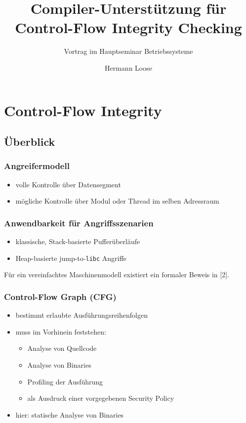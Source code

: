 \documentclass[serif,slidestop,compress,red]{beamer}
\title{Compiler-Unterstützung für \\ Control-Flow Integrity Checking}
\subtitle{Vortrag im Hauptseminar Betriebssysteme}
\author{Hermann Loose}
\begin{document}
\frame[plain]{\titlepage}

\section{Control-Flow Integrity}

\subsection{Überblick}

\begin{frame}
  \frametitle{Angreifermodell}
  \begin{itemize}
    \item volle Kontrolle über Datensegment
    \item mögliche Kontrolle über Modul oder Thread im selben Adressraum
  \end{itemize}
\end{frame}

\begin{frame}
  \frametitle{Anwendbarkeit für Angriffsszenarien}
  \begin{itemize}
    \item klassische, Stack-basierte Pufferüberläufe
    \item Heap-basierte jump-to-\texttt{libc} Angriffe
  \end{itemize}
  Für ein vereinfachtes Maschinenmodell existiert ein formaler Beweis in [2].
\end{frame}

\begin{frame}
  \frametitle{Control-Flow Graph (CFG)}
  \begin{itemize}
    \item bestimmt erlaubte Ausführungsreihenfolgen
    \item muss im Vorhinein feststehen:
    \begin{itemize}
      \item Analyse von Quellcode
      \item Analyse von Binaries
      \item Profiling der Ausführung
      \item als Ausdruck einer vorgegebenen Security Policy
    \end{itemize}
    \item hier: statische Analyse von Binaries
  \end{itemize}
\end{frame}
\end{document}
